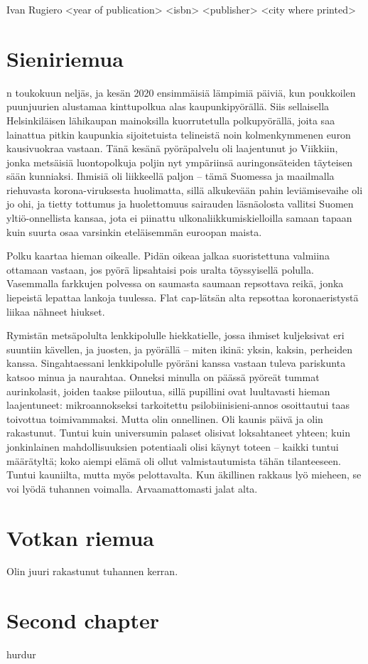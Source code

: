 \documentclass{tsnovel}
\begin{document}
        {Ivan Rugiero}
        {<year of publication>}
        {<isbn>}
        {<publisher>}
        {<city where printed>}

\chapter{Sieniriemua}

n toukokuun neljäs, ja kesän 2020 ensimmäisiä lämpimiä päiviä, kun poukkoilen puunjuurien alustamaa kinttupolkua alas kaupunkipyörällä. Siis sellaisella Helsinkiläisen lähikaupan mainoksilla kuorrutetulla polkupyörällä, joita saa lainattua pitkin kaupunkia sijoitetuista telineistä noin kolmenkymmenen euron kausivuokraa vastaan. Tänä kesänä pyöräpalvelu oli laajentunut jo Viikkiin, jonka metsäisiä luontopolkuja poljin nyt ympäriinsä auringonsäteiden täyteisen sään kunniaksi. Ihmisiä oli liikkeellä paljon – tämä Suomessa ja maailmalla riehuvasta korona-viruksesta huolimatta, sillä alkukevään pahin leviämisevaihe oli jo ohi, ja tietty tottumus ja huolettomuus  sairauden läsnäolosta vallitsi Suomen yltiö-onnellista kansaa, jota ei piinattu ulkonaliikkumiskielloilla samaan tapaan kuin suurta osaa varsinkin eteläisemmän euroopan maista.

Polku kaartaa hieman oikealle. Pidän oikeaa jalkaa suoristettuna valmiina ottamaan vastaan, jos pyörä lipsahtaisi pois uralta töyssyisellä polulla. Vasemmalla farkkujen polvessa on saumasta saumaan repsottava reikä, jonka liepeistä lepattaa lankoja tuulessa. Flat cap-lätsän alta repsottaa koronaeristystä liikaa nähneet hiukset.

Rymistän metsäpolulta lenkkipolulle hiekkatielle, jossa ihmiset kuljeksivat eri suuntiin  kävellen, ja juosten, ja pyörällä – miten ikinä: yksin, kaksin, perheiden kanssa. Singahtaessani lenkkipolulle pyöräni kanssa vastaan tuleva pariskunta katsoo minua ja naurahtaa. Onneksi minulla on päässä pyöreät tummat aurinkolasit, joiden taakse piiloutua, sillä pupillini ovat luultavasti hieman laajentuneet:  mikroannokseksi tarkoitettu psilobiinisieni-annos osoittautui taas toivottua toimivammaksi. Mutta olin onnellinen. Oli kaunis päivä ja olin rakastunut. Tuntui kuin universumin palaset olisivat loksahtaneet yhteen; kuin jonkinlainen mahdollisuuksien potentiaali olisi käynyt toteen – kaikki tuntui määrätyltä; koko aiempi elämä oli ollut valmistautumista tähän tilanteeseen. Tuntui kauniilta, mutta myös pelottavalta. Kun äkillinen rakkaus lyö mieheen, se voi lyödä tuhannen voimalla.  Arvaamattomasti jalat alta.



\chapter{Votkan riemua}
Olin juuri rakastunut tuhannen kerran.



\chapter{Second chapter}

hurdur
\end{document}
